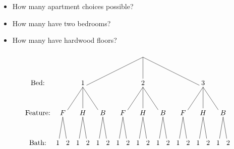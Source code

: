 \documentclass{beamer}
\theoremstyle{definition}
\begin{document}
\begin{frame}
\begin{itemize}
\item How many apartment choices possible?
\item How many have two bedrooms?
\item How many have hardwood floors?
\end{itemize}
\[\begin{xy}<.5cm,0cm>:
(8.5,0)="0";
(2.5,-3)="1";
(8.5,-3)="2";
(14.5,-3)="3";
"0";"1"*+!D{1}**\dir{-};
"0";"2"*+!D{2}**\dir{-};
"0";"3"*+!D{3}**\dir{-};
(.5,-6)="11";
(2.5,-6)="12";
(4.5,-6)="13";
(6.5,-6)="21";
(8.5,-6)="22";
(10.5,-6)="23";
(12.5,-6)="31";
(14.5,-6)="32";
(16.5,-6)="33";
"1";"11"*+!D{F}**\dir{-};
"1";"12"*+!D{H}**\dir{-};
"1";"13"*+!D{B}**\dir{-};
"2";"21"*+!D{F}**\dir{-};
"2";"22"*+!D{H}**\dir{-};
"2";"23"*+!D{B}**\dir{-};
"3";"31"*+!D{F}**\dir{-};
"3";"32"*+!D{H}**\dir{-};
"3";"33"*+!D{B}**\dir{-};
"11";(0,-9)*+!D{1}**\dir{-};
"11";(1,-9)*+!D{2}**\dir{-};
"12";(2,-9)*+!D{1}**\dir{-};
"12";(3,-9)*+!D{2}**\dir{-};
"13";(4,-9)*+!D{1}**\dir{-};
"13";(5,-9)*+!D{2}**\dir{-};
"21";(6,-9)*+!D{1}**\dir{-};
"21";(7,-9)*+!D{2}**\dir{-};
"22";(8,-9)*+!D{1}**\dir{-};
"22";(9,-9)*+!D{2}**\dir{-};
"23";(10,-9)*+!D{1}**\dir{-};
"23";(11,-9)*+!D{2}**\dir{-};
"31";(12,-9)*+!D{1}**\dir{-};
"31";(13,-9)*+!D{2}**\dir{-};
"32";(14,-9)*+!D{1}**\dir{-};
"32";(15,-9)*+!D{2}**\dir{-};
"33";(16,-9)*+!D{1}**\dir{-};
"33";(17,-9)*+!D{2}**\dir{-};
(-2,-3)*+!D{\text{Bed:}};
(-2,-6)*+!D{\text{Feature:}};
(-2,-9)*+!D{\text{Bath:}};
\end{xy}\]
\end{frame}
\end{document}

